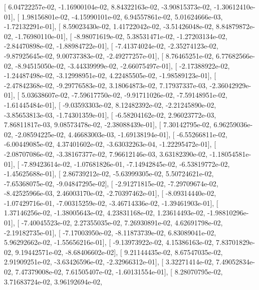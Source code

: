 \documentclass{article}
\begin{document}
       [  6.04722257e-02,  -1.16900104e-02,   8.84322163e-02,
         -3.90815373e-02,  -1.30612410e-01],
       [  1.98156801e-02,  -4.15990101e-02,   6.94557861e-02,
          5.01624666e-03,  -1.72132291e-01],
       [  8.59023430e-02,   1.41722042e-02,  -3.51426048e-02,
          8.84879872e-02,  -1.76980110e-01],
       [ -8.98071619e-02,   5.38531471e-02,  -1.27203134e-02,
         -2.84470898e-02,  -1.88984722e-01],
       [ -7.41374024e-02,  -2.35274123e-02,  -9.87925645e-02,
          9.00737383e-02,  -2.49277257e-01],
       [  8.76465251e-02,   6.77682566e-02,  -8.94515050e-02,
         -3.44339999e-02,  -2.66075497e-01],
       [ -2.17388922e-02,  -1.24487498e-02,  -3.12998951e-02,
          4.22485505e-02,  -1.98589123e-01],
       [ -2.47842368e-02,  -9.29776583e-02,   3.18064873e-02,
          7.17937337e-03,  -2.36042929e-01],
       [  5.03638607e-02,  -7.59617750e-02,  -9.91711026e-02,
         -7.59148951e-02,  -1.61445484e-01],
       [ -9.03593303e-02,   8.12482392e-02,  -2.21245890e-02,
         -3.85653813e-03,  -1.74301359e-01],
       [ -6.58204162e-02,   2.96023772e-03,   7.86811817e-03,
          9.08573478e-02,  -2.38088439e-01],
       [  7.30142795e-02,   6.96259036e-02,  -2.08594225e-02,
          4.46683003e-03,  -1.69138194e-01],
       [ -6.55266811e-02,  -6.00449085e-02,   4.37401602e-02,
         -3.63032263e-04,  -1.22295472e-01],
       [ -2.08707086e-02,  -3.38167377e-02,   7.96612146e-03,
          3.63182390e-02,  -1.18054581e-01],
       [ -7.89423614e-02,  -1.07681826e-01,  -7.14942845e-02,
         -6.53819772e-02,  -1.45625688e-01],
       [  2.86739212e-02,  -5.63999305e-02,   5.50724621e-02,
         -7.65368075e-02,  -9.04847295e-02],
       [ -2.91271815e-02,  -7.29709674e-02,  -8.42525966e-03,
          2.46003170e-02,  -2.70397462e-01],
       [ -8.09314440e-02,  -1.07429716e-01,  -7.00315259e-02,
         -3.46714336e-02,  -1.39461903e-01],
       [  1.37146256e-02,  -1.38005643e-02,   4.23831168e-02,
          1.23614493e-02,  -1.98810296e-01],
       [ -7.40045523e-02,   2.27355035e-02,   7.26930891e-02,
          4.62691798e-02,  -2.19182735e-01],
       [ -7.17003950e-02,  -8.11873739e-02,   6.83089041e-02,
          5.96292662e-02,  -1.55656216e-01],
       [ -9.13973922e-02,   4.15386163e-02,   7.83701829e-02,
          9.19442571e-02,  -8.68406602e-02],
       [  9.21144435e-02,   8.67547035e-02,   2.91909251e-02,
         -3.63426596e-02,  -2.32966312e-01],
       [  3.32271414e-02,   7.49052834e-02,   7.47379008e-02,
          7.61505407e-02,  -1.60131554e-01],
       [  8.28070795e-02,   3.71683724e-02,   3.96192694e-02,
\end{document}
